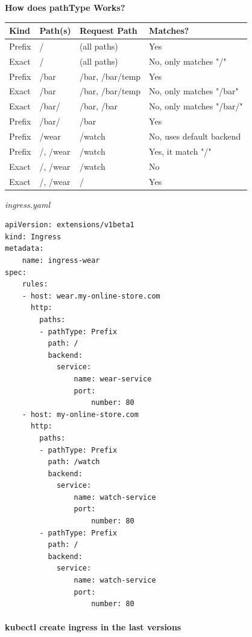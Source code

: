 \documentclass{article}
\newenvironment{codetemplate}[1][]{%
  \mybasecolorbox[#1]
  \itshape
}{%
  \endmybasecolorbox
}
\begin{document}
\textbf{How does pathType Works?}
\begin{table}[H]
\begin{tabular}{| m{2.5cm} | m{2cm} | m{3.5cm} | m{4cm} |}
\hline
\textbf{Kind} & \textbf{Path(s)} & \textbf{Request Path} & \textbf{Matches?} \\ \hline
Prefix & / & (all paths) & Yes \\ \hline
Exact & / & (all paths) & No, only matches "/" \\ \hline
Prefix & /bar & /bar, /bar/temp & Yes \\ \hline
Exact & /bar & /bar, /bar/temp & No, only matches "/bar" \\ \hline
Exact & /bar/ & /bar, /bar & No, only matches "/bar/" \\ \hline
Prefix & /bar/ & /bar & Yes \\ \hline
Prefix & /wear & /watch & No, uses default backend \\ \hline
Prefix & /, /wear & /watch & Yes, it match "/" \\ \hline
Exact & /, /wear & /watch & No \\ \hline
Exact & /, /wear & / & Yes \\ \hline
\end{tabular}
\end{table}

\begin{codetemplate}{ingress.yaml}
\begin{verbatim}
apiVersion: extensions/v1beta1
kind: Ingress
metadata:
    name: ingress-wear
spec:
    rules:
    - host: wear.my-online-store.com
      http:
        paths:
        - pathType: Prefix
          path: /
          backend:
            service:
                name: wear-service
                port:
                    number: 80
    - host: my-online-store.com
      http: 
        paths:
        - pathType: Prefix
          path: /watch
          backend:
            service:
                name: watch-service
                port:
                    number: 80
        - pathType: Prefix
          path: /
          backend:
            service:
                name: watch-service
                port:
                    number: 80
\end{verbatim}
\end{codetemplate}

\paragraph{kubectl create ingress in the last versions}
\end{document}

